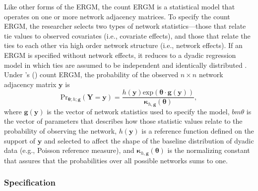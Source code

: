 \documentclass[12pt]{article}
\newcommand\citeapos[1]{\citeauthor{#1}'s (\citeyear{#1})}
\begin{document}
Like other forms of the ERGM, the count ERGM is a statistical model that operates on one or more network adjacency matrices. To specify the count ERGM, the researcher selects two types of network statistics---those that relate tie values to observed covariates (i.e., covariate effects), and those that relate the ties to each other via high order network structure (i.e., network effects). If an ERGM is specified without network effects, it reduces to a dyadic regression model in which ties are assumed to be independent and identically distributed \cite{cranmer2011inferential}. Under \citeapos{krivitsky2012exponential} count ERGM, the probability of the observed $n \times n$ network adjacency matrix $\bm{y}$ is $$ \text{Pr}_{\bm{\theta};h;\bm{g}}( \bm{Y}=\bm{y} )=\frac{ h(\bm{y})\text{exp}( \bm{\theta} \cdot \bm{g} (\bm{y}) )}{\bm{\kappa}_{h,\bm{g}}(\bm{\theta})},$$ where $\bm{g}( \bm{y} )$ is the vector of network statistics used to specify the model, $bm{\theta}$ is the vector of parameters that describes how those statistic values relate to the probability of observing the network, $h(\bm{y})$ is a reference function defined on the support of $\bm{y}$ and selected to affect the shape of the baseline distribution of dyadic data (e.g., Poisson reference measure), and $\bm{\kappa}_{h,\bm{g}}(\bm{\theta})$ is the normalizing constant that assures that the probabilities over all possible networks sums to one.


\subsubsection{Specification}
\end{document}
